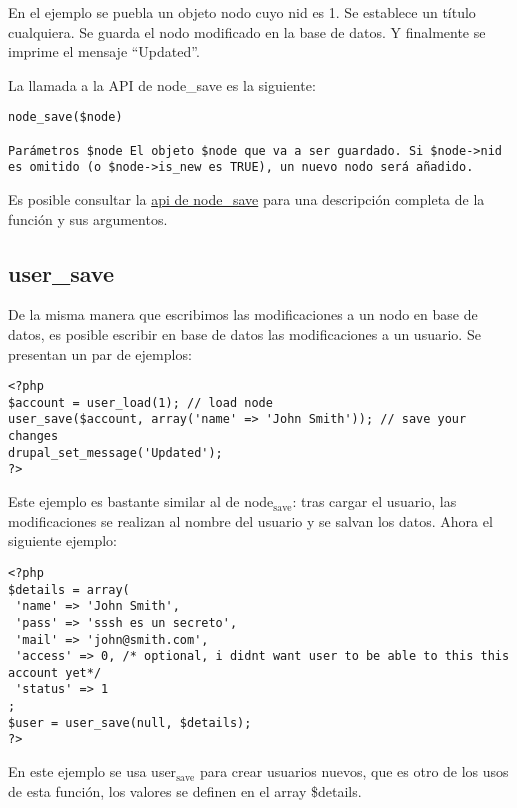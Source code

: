 \documentclass[11pt]{article}
\begin{document}
En el ejemplo se puebla un objeto nodo cuyo nid es 1. Se establece un
título cualquiera. Se guarda el nodo modificado en la base de datos. Y
finalmente se imprime el mensaje ``Updated''.

La llamada a la API de node\_save es la siguiente:


\begin{verbatim}
node_save($node) 

Parámetros $node El objeto $node que va a ser guardado. Si $node->nid
es omitido (o $node->is_new es TRUE), un nuevo nodo será añadido.
\end{verbatim}



Es posible consultar la \href{http://api.drupal.org/api/drupal/modules--node--node.module/function/node_save/7}{api de node\_save} para una descripción
completa de la función y sus argumentos.

\subsection{user\_save}
\label{sec-1.11}


De la misma manera que escribimos las modificaciones a un nodo en base
de datos, es posible escribir en base de datos las modificaciones a un
usuario. Se presentan un par de ejemplos:


\begin{verbatim}
<?php
$account = user_load(1); // load node
user_save($account, array('name' => 'John Smith')); // save your changes
drupal_set_message('Updated');
?>
\end{verbatim}



Este ejemplo es bastante similar al de node$_{\mathrm{save}}$: tras cargar el
usuario, las modificaciones se realizan al nombre del usuario y se
salvan los datos. Ahora el siguiente ejemplo:


\begin{verbatim}
<?php
$details = array(
 'name' => 'John Smith',
 'pass' => 'sssh es un secreto',
 'mail' => 'john@smith.com',
 'access' => 0, /* optional, i didnt want user to be able to this this account yet*/
 'status' => 1
;
$user = user_save(null, $details);
?>
\end{verbatim}



En este ejemplo se usa user$_{\mathrm{save}}$ para crear usuarios nuevos, que es
otro de los usos de esta función, los valores se definen en el array
\$details.
\end{document}
